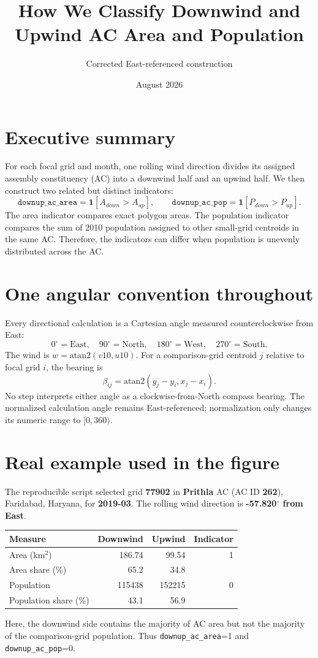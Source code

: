 \documentclass[10pt]{article}
\title{\textbf{How We Classify Downwind and Upwind AC Area and Population}}
\author{Corrected East-referenced construction}
\date{August 2026}
\begin{document}
\maketitle

\section*{Executive summary}
For each focal grid and month, one rolling wind direction divides its assigned
assembly constituency (AC) into a downwind half and an upwind half. We then
construct two related but distinct indicators:
\[
\texttt{downup\_ac\_area}
=\mathbf{1}[A_{down}>A_{up}],
\qquad
\texttt{downup\_ac\_pop}
=\mathbf{1}[P_{down}>P_{up}].
\]
The area indicator compares exact polygon areas. The population indicator
compares the sum of 2010 population assigned to other small-grid centroids in
the same AC. Therefore, the indicators can differ when population is unevenly
distributed across the AC.

\section*{One angular convention throughout}
Every directional calculation is a Cartesian angle measured counterclockwise
from East:
\[
0^\circ=\mathrm{East},\quad 90^\circ=\mathrm{North},\quad
180^\circ=\mathrm{West},\quad 270^\circ=\mathrm{South}.
\]
The wind is $w=\mathrm{atan2}(v10,u10)$. For a comparison-grid centroid $j$
relative to focal grid $i$, the bearing is
\[
\beta_{ij}=\mathrm{atan2}(y_j-y_i,x_j-x_i).
\]
No step interprets either angle as a clockwise-from-North compass bearing.
The normalized calculation angle remains East-referenced; normalization only
changes its numeric range to $[0,360)$.

\section*{Real example used in the figure}
The reproducible script selected grid \textbf{77902} in
\textbf{Prithla} AC
(AC ID \textbf{262}),
Faridabad, Haryana, for
\textbf{2019-03}. The rolling wind direction is
\textbf{-57.820$^\circ$ from East}.

\begin{center}
\begin{tabular}{lrrr}
\hline
Measure & Downwind & Upwind & Indicator \\
\hline
Area (km$^2$) & 186.74 & 99.54 &
1 \\
Area share (\%) & 65.2 & 34.8 & \\
Population & 115438 & 152215 &
0 \\
Population share (\%) & 43.1 & 56.9 & \\
\hline
\end{tabular}
\end{center}
Here, the downwind side contains the majority of AC area but not the majority
of the comparison-grid population. Thus
\texttt{downup\_ac\_area}=1 and
\texttt{downup\_ac\_pop}=0.
\end{document}
